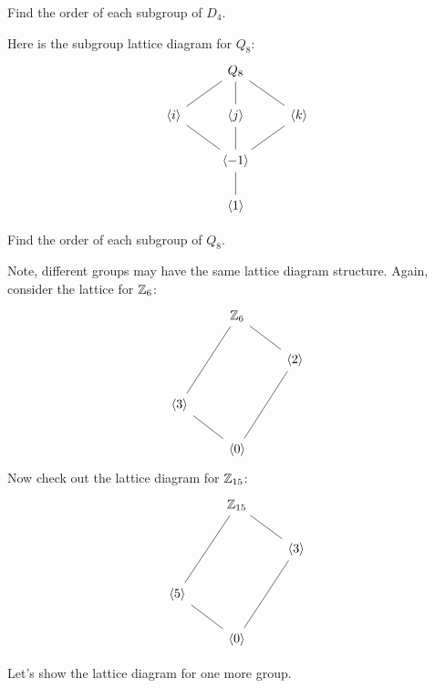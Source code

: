 \documentclass{ximera}
\begin{document}
\begin{exercise}
  Find the order of each subgroup of $D_4$.
\end{exercise}



\begin{example}
  Here is the subgroup lattice diagram for $Q_8$:
  \[
  \begin{tikzcd}
    & Q_8 \ar[rd,-] \ar[d,-] \ar[ld,-] &       \\
    \<i\>  \ar[rd,-] & \<j\>  \ar[d,-]     & \<k\> \ar[ld,-]\\
    &\< -1\> \ar[d,-]&        \\   
    & \<1\> &
  \end{tikzcd}
  \]
\end{example}


\begin{exercise}
  Find the order of each subgroup of $Q_8$.
\end{exercise}



\begin{example}
  Note, different groups may have the same lattice diagram structure.
  Again, consider the lattice for $\mathbb Z_6$:
  \[
  \begin{tikzcd}
    & \Z_6 \ar[rd,-]  \ar[ldd,-] &       \\
    &       & \<2\> \ar[ldd,-]\\
    \< 3\> \ar[rd,-]&       &       \\   
    & \<0\> &
  \end{tikzcd}
  \]
  Now check out the lattice diagram for $\mathbb Z_{15}$:
  \[
  \begin{tikzcd}
    & \Z_{15} \ar[rd,-]  \ar[ldd,-] &       \\
    &       & \<3\> \ar[ldd,-]\\
    \< 5\> \ar[rd,-]&       &       \\   
    & \<0\> &
  \end{tikzcd}
  \]
\end{example}






Let's show the lattice diagram for one more group.
\end{document}
